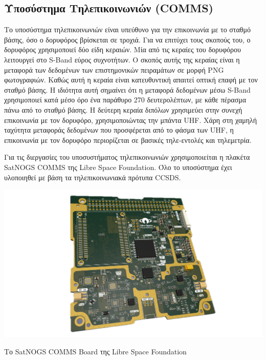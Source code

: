 \documentclass[a4paper,nobib,justified]{tufte-book}
\begin{document}
\subsection{Υποσύστημα Τηλεπικοινωνιών (\acs{COMMS})}
Το υποσύστημα τηλεπικοινωνιών είναι υπεύθυνο για την επικοινωνία με το σταθμό βάσης, όσο ο δορυφόρος βρίσκεται σε τροχιά. Για να επιτύχει τους σκοπούς του, ο δορυφόρος χρησιμοποιεί δύο είδη κεραιών. Μία από τις κεραίες του δορυφόρου λειτουργεί στο S-Band εύρος συχνοτήτων. Ο σκοπός αυτής της κεραίας είναι η μεταφορά των δεδομένων των επιστημονικών πειραμάτων σε μορφή PNG φωτογραφιών. Καθώς αυτή η κεραία είναι κατευθυντική απαιτεί οπτική επαφή με τον σταθμό βάσης. Η ιδιότητα αυτή σημαίνει ότι η μεταφορά δεδομένων μέσω S-Band χρησιμοποιεί κατά μέσο όρο ένα παράθυρο 270 δευτερολέπτων, με κάθε πέρασμα πάνω από το σταθμό βάσης. Η δεύτερη κεραία διπόλων χρησιμεύει στην συνεχή επικοινωνία με τον δορυφόρο, χρησιμοποιώντας την μπάντα UHF. Χάρη στη χαμηλή ταχύτητα μεταφοράς δεδομένων που προσφέρεται από το φάσμα των UHF, η επικοινωνία με τον δορυφόρο περιορίζεται σε βασικές τηλε-εντολές και τηλεμετρία. 

Για τις διεργασίες του υποσυστήματος τηλεπικοινωνιών χρησιμοποιείται η πλακέτα SatNOGS COMMS της Libre Space Foundation. Όλο το υποσύστημα έχει υλοποιηθεί με βάση τα τηλεπικοινωνιακά πρότυπα CCSDS.

\begin{marginfigure}
	\includegraphics{media/images/satnogs-comms.png}
	\caption{Το SatNOGS COMMS Board της Libre Space Foundation}
	\label{fig:satnogs-comms}
\end{marginfigure}

\end{document}
